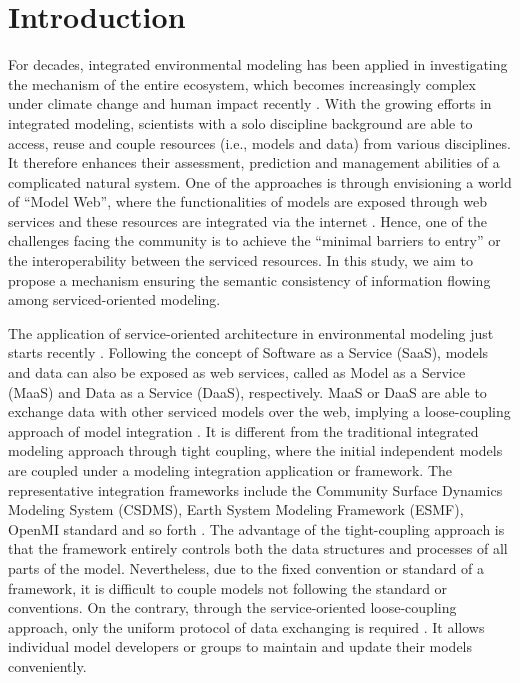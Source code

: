 \documentclass[review]{elsarticle}
\begin{document}
\section{Introduction}For decades, integrated environmental modeling has been applied in investigating the mechanism of the entire ecosystem, which becomes increasingly complex under climate change and human impact recently \citep{argent2004, laniak2013}. With the growing efforts in integrated modeling, scientists with a solo discipline background are able to access, reuse and couple resources (i.e., models and data) from various disciplines. It therefore enhances their assessment, prediction and management abilities of a complicated natural system. One of the approaches is through envisioning a world of “Model Web”, where the functionalities of models are exposed through web services and these resources are integrated via the internet \citep{geller2007, geller2008, nativi2013}. Hence, one of the challenges facing the community is to achieve the “minimal barriers to entry” \citep{nativi2013} or the interoperability between the serviced resources. In this study, we aim to propose a mechanism ensuring the semantic consistency of information flowing among serviced-oriented modeling.

The application of service-oriented architecture in environmental modeling just starts recently \citep{castronova2013, mineter2003, granell2010, goodall2011, goodall2013}. Following the concept of Software as a Service (SaaS), models and data can also be exposed as web services, called as Model as a Service (MaaS) and Data as a Service (DaaS), respectively. MaaS or DaaS are able to exchange data with other serviced models over the web, implying a loose-coupling approach of model integration \citep{goodall2011}. It is different from the traditional integrated modeling approach through tight coupling, where the initial independent models are coupled under a modeling integration application or framework. The representative integration frameworks include the Community Surface Dynamics Modeling System (CSDMS), Earth System Modeling Framework (ESMF), OpenMI standard and so forth \citep{hill2004, peckham2013, moore2005}. The advantage of the tight-coupling approach is that the framework entirely controls both the data structures and processes of all parts of the model. Nevertheless, due to the fixed convention or standard of a framework, it is difficult to couple models not following the standard or conventions. On the contrary, through the service-oriented loose-coupling approach, only the uniform protocol of data exchanging is required \citep{goodall2011}. It allows individual model developers or groups to maintain and update their models conveniently.
\end{document}
